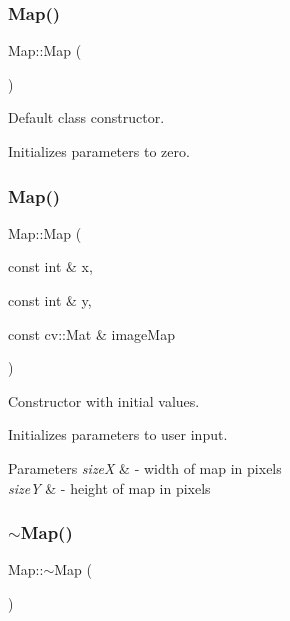 \subsubsection{\texorpdfstring{Map()}{Map()}\hspace{0.1cm}{\footnotesize\ttfamily [1/2]}}
{\footnotesize\ttfamily Map\+::\+Map (\begin{DoxyParamCaption}{ }\end{DoxyParamCaption})}



Default class constructor. 

Initializes parameters to zero. \mbox{\label{classMap_a57ace230b27f1782023c08bce3e9f97a}} 
\subsubsection{\texorpdfstring{Map()}{Map()}\hspace{0.1cm}{\footnotesize\ttfamily [2/2]}}
{\footnotesize\ttfamily Map\+::\+Map (\begin{DoxyParamCaption}\item[{const int \&}]{x,  }\item[{const int \&}]{y,  }\item[{const cv\+::\+Mat \&}]{image\+Map }\end{DoxyParamCaption})}



Constructor with initial values. 

Initializes parameters to user input.


\begin{DoxyParams}{Parameters}
{\em sizeX} & -\/ width of map in pixels \\
\hline
{\em sizeY} & -\/ height of map in pixels \\
\hline
\end{DoxyParams}
\mbox{\label{classMap_aa403fbe09394ccf39747588f5168e3b2}} 
\subsubsection{\texorpdfstring{$\sim$\+Map()}{~Map()}}
{\footnotesize\ttfamily Map\+::$\sim$\+Map (\begin{DoxyParamCaption}{ }\end{DoxyParamCaption})}



